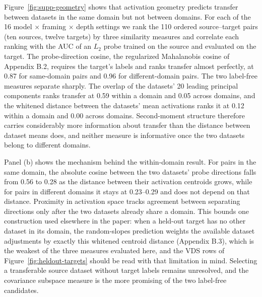 Figure~\ref{fig:supp-geometry} shows that activation geometry predicts transfer
between datasets in the same domain but not between domains. For each of the 16
model $\times$ framing $\times$ depth settings we rank the 110 ordered
source--target pairs (ten sources, twelve targets) by three similarity measures
and correlate each ranking with the AUC of an $L_2$ probe trained on the source
and evaluated on the target. The probe-direction cosine, the regularized
Mahalanobis cosine of Appendix B.2, requires the target's labels and ranks
transfer almost perfectly, at 0.87 for same-domain pairs and 0.96 for
different-domain pairs. The two label-free measures separate sharply. The
overlap of the datasets' 20 leading principal components ranks transfer at 0.59
within a domain and 0.05 across domains, and the whitened distance between the
datasets' mean activations ranks it at 0.12 within a domain and 0.00 across
domains. Second-moment structure therefore carries considerably more
information about transfer than the distance between dataset means does, and
neither measure is informative once the two datasets belong to different
domains.

Panel (b) shows the mechanism behind the within-domain result. For pairs in the
same domain, the absolute cosine between the two datasets' probe directions
falls from 0.56 to 0.28 as the distance between their activation centroids
grows, while for pairs in different domains it stays at 0.23--0.29 and does not
depend on that distance. Proximity in activation space tracks agreement between
separating directions only after the two datasets already share a domain. This
bounds one construction used elsewhere in the paper: when a held-out target has
no other dataset in its domain, the random-slopes prediction weights the
available dataset adjustments by exactly this whitened centroid distance
(Appendix B.3), which is the weakest of the three measures evaluated here, and
the VDS rows of Figure~\ref{fig:heldout-targets} should be read with that
limitation in mind. Selecting a transferable source dataset without target
labels remains unresolved, and the covariance subspace measure is the more
promising of the two label-free candidates.
